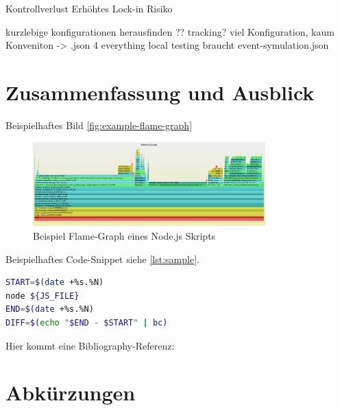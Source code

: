 \documentclass[
12pt,
english,
ngerman,
headsepline,
twoside,
openright,
numbers=noenddot,version=first
]{scrreprt}
\begin{document}
Kontrollverlust
Erhöhtes Lock-in Risiko

kurzlebige konfigurationen herausfinden ?? tracking?
viel Konfiguration, kaum Konveniton -> .json 4 everything
local testing braucht event-symulation.json

\chapter{Zusammenfassung und Ausblick}


Beispielhaftes Bild \autoref{fig:example-flame-graph}

\begin{figure}[h]
	\centering
	\includegraphics[width=0.8\textwidth]{pics/example-flame-graph.eps}
	\caption{Beispiel Flame-Graph eines Node.js Skripts}
	\label{fig:example-flame-graph}
\end{figure}

Beispielhaftes Code-Snippet siehe \autoref{lst:sample}.

\begin{lstlisting}[language=bash,caption={Aufnahme der \glqq real\grqq-Zeit},label={lst:sample}]
START=$(date +%s.%N)
node ${JS_FILE}
END=$(date +%s.%N)
DIFF=$(echo "$END - $START" | bc)
\end{lstlisting}

Hier kommt eine Bibliography-Referenz: \cite{booch2007object}

\lstlistoflistings

\listoffigures

\listoftables

\chapter*{Abkürzungen}


\end{document}
